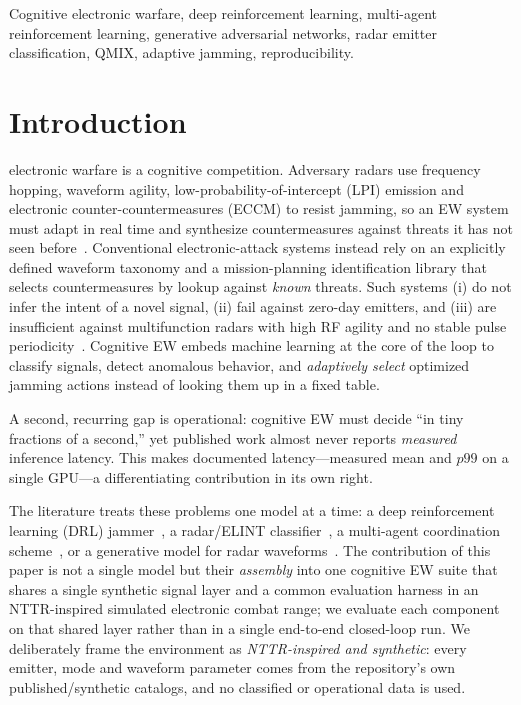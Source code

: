 \documentclass[journal]{IEEEtran}
\begin{document}
\begin{IEEEkeywords}
Cognitive electronic warfare, deep reinforcement learning, multi-agent reinforcement learning,
generative adversarial networks, radar emitter classification, QMIX, adaptive jamming,
reproducibility.
\end{IEEEkeywords}

\section{Introduction}
 electronic warfare is a cognitive competition. Adversary radars use
frequency hopping, waveform agility, low-probability-of-intercept (LPI) emission and electronic
counter-countermeasures (ECCM) to resist jamming, so an EW system must adapt in real time and
synthesize countermeasures against threats it has not seen before~\cite{emsopedia_cognitiveew}.
Conventional electronic-attack systems instead rely on an explicitly defined waveform taxonomy
and a mission-planning identification library that selects countermeasures by lookup against
\emph{known} threats. Such systems (i) do not infer the intent of a novel signal, (ii) fail
against zero-day emitters, and (iii) are insufficient against multifunction radars with high RF
agility and no stable pulse periodicity~\cite{emsopedia_cognitiveew,us11808882}. Cognitive EW
embeds machine learning at the core of the loop to classify signals, detect anomalous behavior,
and \emph{adaptively select} optimized jamming actions instead of looking them up in a fixed
table.

A second, recurring gap is operational: cognitive EW must decide ``in tiny fractions of a
second,'' yet published work almost never reports \emph{measured} inference latency. This makes
documented latency---measured mean and $p99$ on a single GPU---a differentiating contribution in
its own right.

The literature treats these problems one model at a time: a deep reinforcement learning (DRL)
jammer~\cite{zhao2022sac,wang2022d3qn}, a radar/ELINT
classifier~\cite{matuszewski2021cnn,liu2019attrnn}, a multi-agent coordination
scheme~\cite{cai2025macjd,swarm2025qmix}, or a generative model for radar
waveforms~\cite{lpd2025cwgan}. The contribution of this paper is not a single model but their
\emph{assembly} into one cognitive EW suite that shares a single synthetic signal layer and a
common evaluation harness in an NTTR-inspired simulated electronic combat range; we evaluate each
component on that shared layer rather than in a single end-to-end closed-loop run. We deliberately frame the
environment as \emph{NTTR-inspired and synthetic}: every emitter, mode and waveform parameter
comes from the repository's own published/synthetic catalogs, and no classified or operational
data is used.
\end{document}
